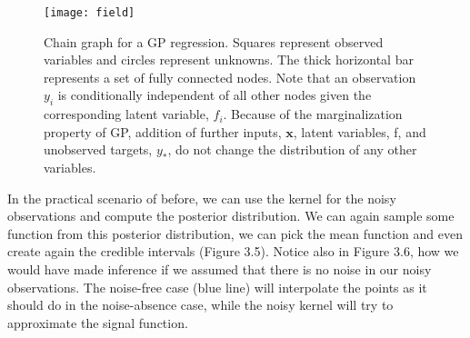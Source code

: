 \documentclass[12pt,a4paper,oneside]{book}
\theoremstyle{plain}
\theoremstyle{definition}
\begin{document}
{\begin{figure}[h]
\begin{center}
\texttt{[image: field]}
\caption{Chain graph for a GP regression. Squares represent observed variables and circles represent unknowns. The thick horizontal bar represents a set of fully connected nodes. Note that an observation $y_i$ is conditionally independent of all other nodes given the corresponding latent variable, $f_i$. Because of the marginalization property of GP, addition of further inputs, $\bm{x}$, latent variables, f, and unobserved targets, $y_*$, do not change the distribution of any other variables.}
\end{center}
\end{figure}

\vspace{3mm}
\noindent
In the practical scenario of before, we can use the kernel for the noisy observations and compute the posterior distribution. We can again sample some function from this posterior distribution, we can pick the mean function and even create again the credible intervals (Figure 3.5). Notice also in Figure 3.6, how we would have made inference if we assumed that there is no noise in our noisy observations. The noise-free case (blue line) will interpolate the points as it should do in the noise-absence case, while the noisy kernel will try to approximate the signal function. 
   
}
\end{document}
